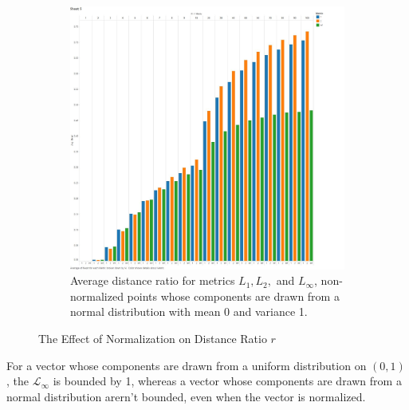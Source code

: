 \documentclass{article}
\begin{document}
\begin{figure}[H]
\begin{subfigure}[h]{0.75\textwidth}
        \includegraphics[width=1\textwidth]{exp2without_normalization.jpg}
        \caption{Average distance ratio for metrics $L_1,L_2,$ and $L_{\infty}$, non-normalized points whose components are drawn from a normal distribution with mean 0 and variance 1.}
        \label{fig:no_normalization}
        \end{subfigure}
        \caption{The Effect of Normalization on Distance Ratio $r$}
\end{figure}
\pagebreak
For a vector whose components are drawn from a uniform distribution on $(0, 1)$, the $\mathcal{L}_{\infty}$ is bounded by 1, whereas a vector whose components are drawn from a normal distribution arern't bounded, even when the vector is normalized.
\end{document}
